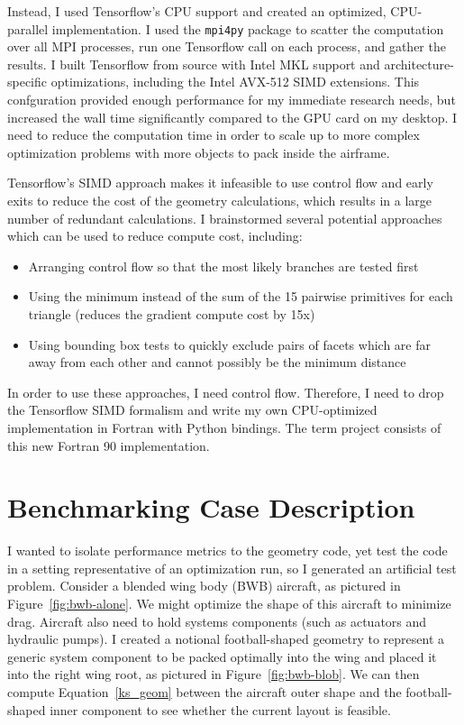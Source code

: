 \documentclass[11pt,letterpaper]{article}
\begin{document}
\qquad Instead, I used Tensorflow's CPU support and created an optimized, CPU-parallel implementation.
I used the \texttt{mpi4py} package to scatter the computation over all MPI processes, run one Tensorflow call on each process, and gather the results.
I built Tensorflow from source with Intel MKL support and architecture-specific optimizations, including the Intel AVX-512 SIMD extensions.
This confguration provided enough performance for my immediate research needs, but increased the wall time significantly compared to the GPU card on my desktop.
I need to reduce the computation time in order to scale up to more complex optimization problems with more objects to pack inside the airframe.

\qquad Tensorflow's SIMD approach makes it infeasible to use control flow and early exits to reduce the cost of the geometry calculations, which results in a large number of redundant calculations.
I brainstormed several potential approaches which can be used to reduce compute cost, including:
\begin{itemize}
  \item Arranging control flow so that the most likely branches are tested first
  \item Using the minimum instead of the sum of the 15 pairwise primitives for each triangle (reduces the gradient compute cost by 15x)
  \item Using bounding box tests to quickly exclude pairs of facets which are far away from each other and cannot possibly be the minimum distance
\end{itemize}
In order to use these approaches, I need control flow. 
Therefore, I need to drop the Tensorflow SIMD formalism and write my own CPU-optimized implementation in Fortran with Python bindings.
The term project consists of this new Fortran 90 implementation.

\section{Benchmarking Case Description}
\qquad I wanted to isolate performance metrics to the geometry code, yet test the code in a setting representative of an optimization run, so I generated an artificial test problem.
Consider a blended wing body (BWB) aircraft, as pictured in Figure~\ref{fig:bwb-alone}.
We might optimize the shape of this aircraft to minimize drag.
Aircraft also need to hold systems components (such as actuators and hydraulic pumps).
I created a notional football-shaped geometry to represent a generic system component to be packed optimally into the wing and placed it into the right wing root, as pictured in Figure~\ref{fig:bwb-blob}.
We can then compute Equation~\ref{ks_geom} between the aircraft outer shape and the football-shaped inner component to see whether the current layout is feasible.
\end{document}
